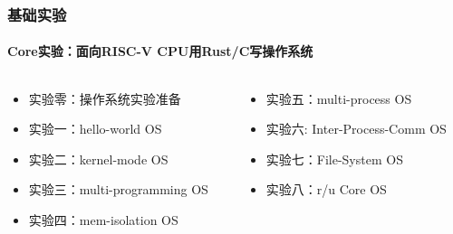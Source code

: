 \begin{frame}
\frametitle{基础实验}
\framesubtitle{Core实验：面向RISC-V CPU用Rust/C写操作系统} \pause
\begin{columns}
	
\begin{column}{0.5\textwidth}
\begin{itemize}
		\item 实验零：操作系统实验准备
		\item 实验一：hello-world OS
		\item 实验二：kernel-mode OS
		\item 实验三：multi-programming OS
		\item 实验四：mem-isolation OS
\end{itemize}
\end{column}
 
\begin{column}{0.5\textwidth}
    \begin{itemize}
		\item 实验五：multi-process OS
		\item 实验六: Inter-Process-Comm OS
		\item 实验七：File-System OS
		\item 实验八：r/u Core OS
	\end{itemize}
\end{column}

\end{columns}

\end{frame}



